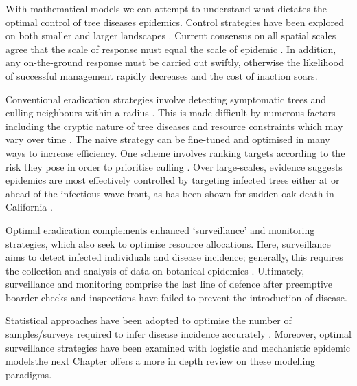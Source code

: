 With mathematical models we can attempt to understand what dictates the optimal control of tree diseases epidemics. 
Control strategies have been explored on both smaller \cite{risk-potential-control} 
and larger landscapes \cite{large-scale-control2}. Current consensus on all spatial scales
agree that the scale of response must equal the scale of epidemic \cite{control-scale-matching}. In addition, 
any on-the-ground response must be carried out swiftly, otherwise the likelihood of successful management rapidly decreases and the cost of inaction soars.

Conventional eradication strategies involve detecting symptomatic trees and culling neighbours within a radius \cite{WEBIDEMICS}.
This is made difficult by numerous factors including the cryptic nature of tree diseases and resource constraints which may vary
over time \cite{control-theory, control-theory-application}. The naive strategy can be fine-tuned and optimised in many ways to increase
efficiency. One scheme involves ranking targets according to the risk they pose in order to prioritise culling \cite{risk-potential-control}.
Over large-scales, evidence suggests epidemics are most effectively controlled by targeting infected trees either at or ahead of
the infectious wave-front, as has been shown for sudden oak death in California \cite{large-scale-control}.

Optimal eradication complements enhanced `surveillance' and monitoring strategies, 
which also seek to optimise resource allocations. Here, surveillance aims to detect infected individuals and disease incidence;
generally, this requires the collection and analysis of data on botanical epidemics \cite{surveillance-review}.
Ultimately, surveillance and monitoring comprise the last line of defence after preemptive boarder 
checks and inspections have failed to prevent the introduction of disease. 

Statistical approaches have been adopted to optimise the number of samples/surveys required to infer disease incidence accurately \cite{yamamura2016sampling}.
Moreover, optimal surveillance strategies have been examined with logistic \cite{parnell2012estimating} 
and mechanistic \cite{WEBIDEMICS} epidemic models\textemdash the next Chapter offers a more in depth review on these modelling paradigms.

